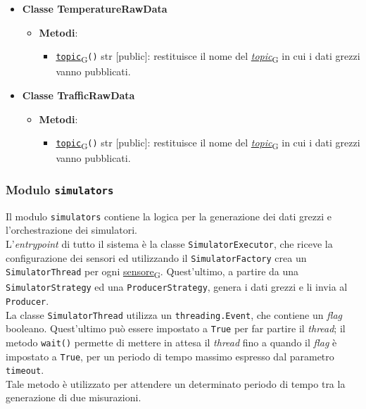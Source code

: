 \begin{itemize}
\begin{itemize}
\begin{itemize}
		            \end{itemize}
	      \end{itemize}
	\item \textbf{Classe TemperatureRawData}
	      \begin{itemize}
		      \item \textbf{Metodi}:
		            \begin{itemize}
			            \item \href{https://7last.github.io/docs/pb/documentazione-interna/glossario\#topic}{\texttt{topic}\textsubscript{G}}\texttt{()} str [public]: restituisce il nome del \href{https://7last.github.io/docs/pb/documentazione-interna/glossario\#topic}{\textit{topic}\textsubscript{G}} in cui i dati grezzi vanno pubblicati.
		            \end{itemize}
	      \end{itemize}
	\item \textbf{Classe TrafficRawData}
	      \begin{itemize}
		      \item \textbf{Metodi}:
		            \begin{itemize}
			            \item \href{https://7last.github.io/docs/pb/documentazione-interna/glossario\#topic}{\texttt{topic}\textsubscript{G}}\texttt{()} str [public]: restituisce il nome del \href{https://7last.github.io/docs/pb/documentazione-interna/glossario\#topic}{\textit{topic}\textsubscript{G}} in cui i dati grezzi vanno pubblicati.
		            \end{itemize}
	      \end{itemize}
\end{itemize}

\subsubsection{Modulo \texttt{simulators}}
Il modulo \texttt{simulators} contiene la logica per la generazione dei dati grezzi e l'orchestrazione dei simulatori.\\
L'\textit{entrypoint} di tutto il sistema è la classe \texttt{SimulatorExecutor}, che riceve la configurazione dei sensori
ed utilizzando il \texttt{SimulatorFactory} crea un \texttt{SimulatorThread} per ogni \href{https://7last.github.io/docs/pb/documentazione-interna/glossario\#sensore}{sensore\textsubscript{G}}.
Quest'ultimo, a partire da una \texttt{SimulatorStrategy} ed una \texttt{ProducerStrategy}, genera i dati grezzi e li invia al \texttt{Producer}.\\
La classe \texttt{SimulatorThread} utilizza un \texttt{threading.Event}, che contiene un \textit{flag} booleano.
Quest'ultimo può essere impostato a \texttt{True} per far partire il \textit{thread}; il metodo \texttt{wait()} permette di mettere in attesa il \textit{thread} fino a quando il \textit{flag} è
impostato a \texttt{True}, per un periodo di tempo massimo espresso dal parametro \texttt{timeout}.\\ Tale metodo è utilizzato per attendere un determinato periodo di tempo tra la generazione di due misurazioni.\\


